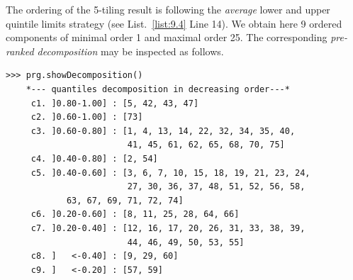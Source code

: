 The ordering of the 5-tiling result is following the \emph{average} lower and upper quintile limits strategy (see List.~\vref{list:9.4} Line 14). We obtain here 9 ordered components of minimal order 1 and maximal order 25. The corresponding \emph{pre-ranked decomposition} may be inspected as follows.
\begin{lstlisting}[caption={The quantiles decomposition of a pre-ranked outranking digraph},label=list:9.5]
>>> prg.showDecomposition()
    *--- quantiles decomposition in decreasing order---*
     c1. ]0.80-1.00] : [5, 42, 43, 47]
     c2. ]0.60-1.00] : [73]
     c3. ]0.60-0.80] : [1, 4, 13, 14, 22, 32, 34, 35, 40,
                        41, 45, 61, 62, 65, 68, 70, 75]
     c4. ]0.40-0.80] : [2, 54]
     c5. ]0.40-0.60] : [3, 6, 7, 10, 15, 18, 19, 21, 23, 24,
                        27, 30, 36, 37, 48, 51, 52, 56, 58,
			63, 67, 69, 71, 72, 74]
     c6. ]0.20-0.60] : [8, 11, 25, 28, 64, 66]
     c7. ]0.20-0.40] : [12, 16, 17, 20, 26, 31, 33, 38, 39,
                        44, 46, 49, 50, 53, 55]
     c8. ]   <-0.40] : [9, 29, 60]
     c9. ]   <-0.20] : [57, 59]
\end{lstlisting}

